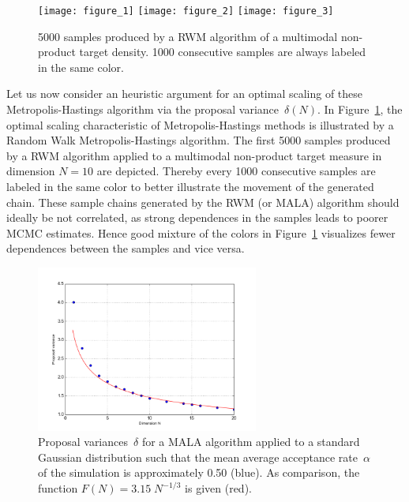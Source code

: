 \begin{figure}%
 \begin{center} 
  \texttt{[image: figure\_1]}
  \vspace*{1mm}
  \label{fig:3DscatterplotRWM-optimal}
  \vspace*{3mm}
  \texttt{[image: figure\_2]}
  \vspace*{1mm}
  \label{fig:3DscatterplotRWM-small}
  \vspace*{3mm}
  \texttt{[image: figure\_3]}
  \vspace*{1mm}
  \label{fig:3DscatterplotRWM-large}
 \end{center}
  \caption{5000 samples produced by a RWM algorithm of a multimodal non-product target density. 1000 consecutive samples are always labeled in the same color.}
  \label{fig:3DscatterplotRWM}
\end{figure}

Let us now consider an heuristic argument for an optimal scaling of these Metropolis-Hastings algorithm via the proposal variance~$\delta(N)$. In Figure~\ref{fig:3DscatterplotRWM}, the optimal scaling characteristic of Metropolis-Hastings methods is illustrated by a Random Walk Metropolis-Hastings algorithm. The first 5000 samples produced by a RWM algorithm applied to a multimodal non-product target measure in dimension $N=10$ are depicted. Thereby every 1000 consecutive samples are labeled in the same color to better illustrate the movement of the generated chain. These sample chains generated by the RWM (or MALA) algorithm should ideally be not correlated, as strong dependences in the samples leads to poorer MCMC estimates. Hence good mixture of the colors in Figure~\ref{fig:3DscatterplotRWM} visualizes fewer dependences between the samples and vice versa. 

\begin{figure}[htb]
\begin{center}
  \includegraphics[width=0.65\textwidth]{proposalvariancesForDimensions}
\end{center}
  \caption{Proposal variances~$\delta$ for a MALA algorithm applied to a standard Gaussian distribution such that the mean average acceptance rate~$\alpha$ of the simulation is approximately 0.50 (blue). As comparison, the function $F(N) = 3.15 \; N^{-1/3}$ is given (red).}
  \label{fig:proposalVarianceForDimensions}
\end{figure}

